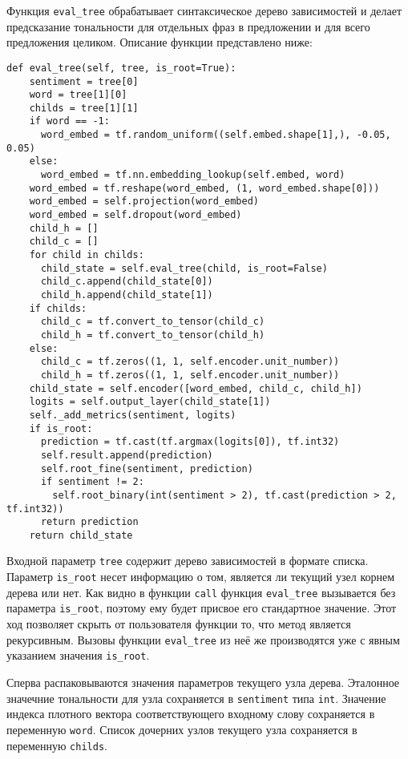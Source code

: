 Функция \texttt{eval\_tree} обрабатывает синтаксическое дерево зависимостей и делает предсказание тональности для отдельных фраз в предложении и для всего предложения целиком. Описание функции представлено ниже:
\medskip
\begin{lstlisting}[style=Python]
  def eval_tree(self, tree, is_root=True):
    sentiment = tree[0]
    word = tree[1][0]
    childs = tree[1][1]
    if word == -1:
      word_embed = tf.random_uniform((self.embed.shape[1],), -0.05, 0.05)
    else:
      word_embed = tf.nn.embedding_lookup(self.embed, word)
    word_embed = tf.reshape(word_embed, (1, word_embed.shape[0]))
    word_embed = self.projection(word_embed)
    word_embed = self.dropout(word_embed)
    child_h = []
    child_c = []
    for child in childs:
      child_state = self.eval_tree(child, is_root=False)
      child_c.append(child_state[0])
      child_h.append(child_state[1])
    if childs:
      child_c = tf.convert_to_tensor(child_c)
      child_h = tf.convert_to_tensor(child_h)
    else:
      child_c = tf.zeros((1, 1, self.encoder.unit_number))
      child_h = tf.zeros((1, 1, self.encoder.unit_number))
    child_state = self.encoder([word_embed, child_c, child_h])
    logits = self.output_layer(child_state[1])
    self._add_metrics(sentiment, logits)
    if is_root:
      prediction = tf.cast(tf.argmax(logits[0]), tf.int32)
      self.result.append(prediction)
      self.root_fine(sentiment, prediction)
      if sentiment != 2:
        self.root_binary(int(sentiment > 2), tf.cast(prediction > 2, tf.int32))
      return prediction
    return child_state
\end{lstlisting}
\medskip

Входной параметр \texttt{tree} содержит дерево зависимостей в формате списка. Параметр \texttt{is\_root} несет информацию о том, является ли текущий узел корнем дерева или нет. Как видно в функции \texttt{call} функция \texttt{eval\_tree} вызывается без параметра \texttt{is\_root}, поэтому ему будет присвое его стандартное значение. Этот ход позволяет скрыть от пользователя функции то, что метод является рекурсивным. Вызовы функции \texttt{eval\_tree} из неё же производятся уже с явным указанием значения \texttt{is\_root}.

Сперва распаковываются значения параметров текущего узла дерева. Эталонное значечние тональности для узла сохраняется в \texttt{sentiment} типа \texttt{int}. Значение индекса плотного вектора соответствующего входному слову сохраняется в переменную \texttt{word}. Список дочерних узлов текущего узла сохраняется в переменную \texttt{childs}.

